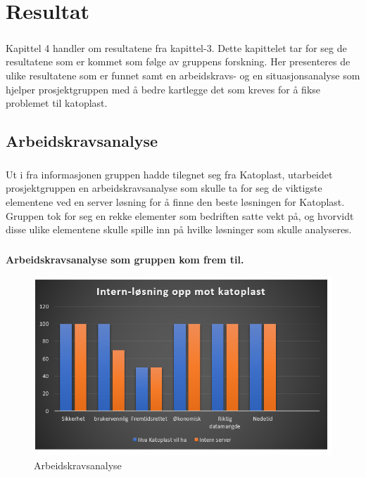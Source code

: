 \chapter{Resultat}
\paragraph{} Kapittel 4 handler om resultatene fra kapittel-3. Dette kapittelet tar for seg de resultatene som er kommet som følge av gruppens forskning. Her presenteres de ulike resultatene som er funnet samt en arbeidskravs- og en situasjonsanalyse som hjelper prosjektgruppen med å bedre kartlegge det som kreves for å fikse problemet til katoplast.

\section{Arbeidskravsanalyse} 
\paragraph{} Ut i fra informasjonen gruppen hadde tilegnet seg fra Katoplast, utarbeidet prosjektgruppen en arbeidskravsanalyse som skulle ta for seg de viktigste elementene ved en server løsning for å finne den beste løsningen for Katoplast. Gruppen tok for seg en rekke elementer som bedriften satte vekt på, og hvorvidt disse ulike elementene skulle spille inn på hvilke løsninger som skulle analyseres.

\paragraph{}\textbf{Arbeidskravsanalyse som gruppen kom frem til. }
\begin{figure}[H]
\centering
\includegraphics[width=5.5in]{Bilder/abc.PNG}
\caption{Arbeidskravsanalyse}
\end{figure}


